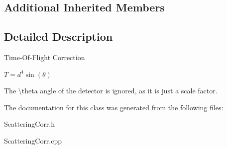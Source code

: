 \subsection*{Additional Inherited Members}


\subsection{Detailed Description}
Time-\/\+Of-\/\+Flight Correction

$ T = d^4\sin(\theta) $

The \textbackslash{}theta angle of the detector is ignored, as it is just a scale factor. 

The documentation for this class was generated from the following files\+:\begin{DoxyCompactItemize}
\item 
Scattering\+Corr.\+h\item 
Scattering\+Corr.\+cpp\end{DoxyCompactItemize}
